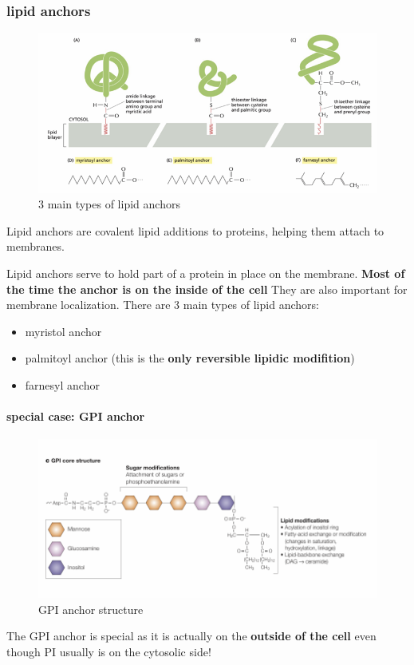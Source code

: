 \documentclass[../main.tex]{subfiles}
\begin{document}
\subsubsection{lipid anchors}
\begin{figure}[H]
    \centering
    \includegraphics[width=0.5\linewidth]{lipid_anchors.png}
    \caption{3 main types of lipid anchors}
    \label{fig:enter-label}
\end{figure}
Lipid anchors are covalent lipid additions to proteins, helping them attach to membranes.
\par
Lipid anchors serve to hold part of a protein in place on the membrane. \textbf{Most of the time the anchor is on the inside of the cell} They are also important for membrane localization. There are 3 main types of lipid anchors:
\begin{itemize}
    \item myristol anchor
    \item palmitoyl anchor (this is the \textbf{only reversible lipidic modifition})
    \item farnesyl anchor
    
\end{itemize}

\paragraph{special case: GPI anchor}

\begin{figure}[H]
    \centering
    \includegraphics[width=\linewidth]{GPI.png}
    \caption{GPI anchor structure}
    \label{fig:enter-label}
\end{figure}
The GPI anchor is special as it is actually on the \textbf{outside of the cell} even though PI usually is on the cytosolic side! 
\end{document}
